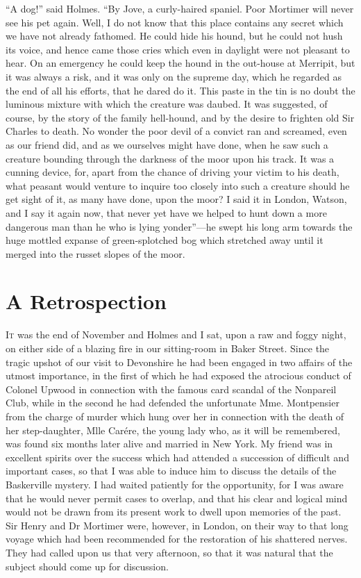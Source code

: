 \documentclass[paper=5.5in:8.5in,BCOR=7mm,twoside,DIV=calc,12pt,usegeometry,openany,chapterprefix,endperiod]{scrbook} %
\begin{document}
\enquote{A dog!} said Holmes. \enquote{By Jove, a curly-haired spaniel. Poor Mortimer will never see his pet again. Well, I do not know that this place contains any secret which we have not already fathomed. He could hide his hound, but he could not hush its voice, and hence came those cries which even in daylight were not pleasant to hear. On an emergency he could keep the hound in the out-house at Merripit, but it was always a risk, and it was only on the supreme day, which he regarded as the end of all his efforts, that he dared do it. This paste in the tin is no doubt the luminous mixture with which the creature was daubed. It was suggested, of course, by the story of the family hell-hound, and by the desire to frighten old Sir Charles to death. No wonder the poor devil of a convict ran and screamed, even as our friend did, and as we ourselves might have done, when he saw such a creature bounding through the darkness of the moor upon his track. It was a cunning device, for, apart from the chance of driving your victim to his death, what peasant would venture to inquire too closely into such a creature should he get sight of it, as many have done, upon the moor? I said it in London, Watson, and I say it again now, that never yet have we helped to hunt down a more dangerous man than he who is lying yonder}\nobreakdash---he swept his long arm towards the huge mottled expanse of green-splotched bog which stretched away until it merged into the russet slopes of the moor.

\chapter{A Retrospection}

\lettrine[lines=1]{I}{t} was the end of November and Holmes and I sat, upon a raw and foggy night, on either side of a blazing fire in our sitting-room in Baker Street. Since the tragic upshot of our visit to Devonshire he had been engaged in two affairs of the utmost importance, in the first of which he had exposed the atrocious conduct of Colonel Upwood in connection with the famous card scandal of the Nonpareil Club, while in the second he had defended the unfortunate Mme. Montpensier from the charge of murder which hung over her in connection with the death of her step-daughter, Mlle Carére, the young lady who, as it will be re\-mem\-bered, was found six months later alive and married in New York. My friend was in excellent spirits over the success which had attended a succession of difficult and important cases, so that I was able to induce him to discuss the details of the Baskerville mystery. I had waited patiently for the opportunity, for I was aware that he would never permit cases to overlap, and that his clear and logical mind would not be drawn from its present work to dwell upon memories of the past. Sir Henry and Dr Mortimer were, however, in London, on their way to that long voyage which had been recommended for the restoration of his shattered nerves. They had called upon us that very afternoon, so that it was natural that the subject should come up for discussion.
\end{document}
